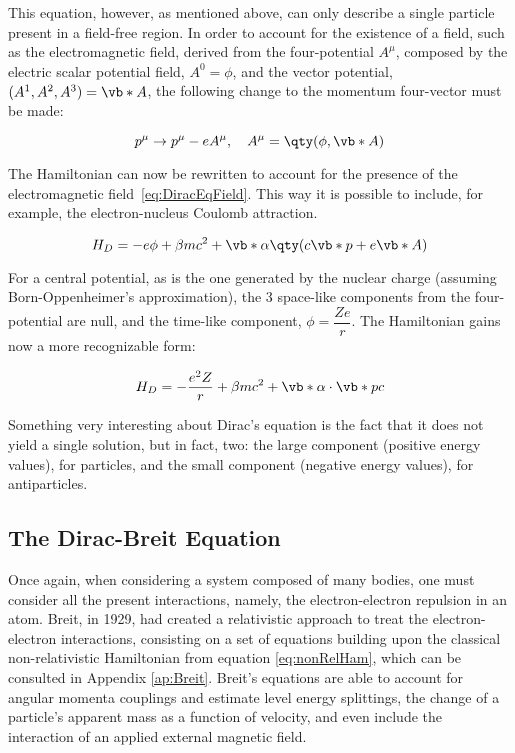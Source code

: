 This equation, however, as mentioned above, can only describe a single particle present in a field-free region. In order to account for the existence of a field, such as the electromagnetic field, derived from the four-potential $A^\mu$, composed by the electric scalar potential field, $A^0=\phi$, and the vector potential, $(A^1,A^2,A^3)=\vb*{A}$, the following change to the momentum four-vector must be made:


\begin{equation}
    p^\mu \rightarrow p^\mu - e A^\mu,\quad A^\mu = \qty(\phi,\vb*{A})
\end{equation}

The Hamiltonian can now be rewritten to account for the presence of the electromagnetic field~\eqref{eq:DiracEqField}. This way it is possible to include, for example, the electron-nucleus Coulomb attraction.

\begin{equation}
    H_D=-e\phi + \beta m c^2 + \vb*{\alpha}\qty(c\vb*{p}+e\vb*{A})
    \label{eq:DiracEqField}
\end{equation}

For a central potential, as is the one generated by the nuclear charge (assuming Born-Oppenheimer's approximation), the 3 space-like components from the four-potential are null, and the time-like component, $\phi=\dfrac{Z e}{r}$. The Hamiltonian gains now a more recognizable form:

\begin{equation}
    H_D=-\frac{e^2 Z}{r} + \beta m c^2 + \vb*{\alpha}\cdot\vb*{p}c
    \label{eq:diracHam}
\end{equation}

Something very interesting about Dirac's equation is the fact that it does not yield a single solution, but in fact, two: the large component (positive energy values), for particles, and the small component (negative energy values), for antiparticles.

\subsection{The Dirac-Breit Equation}

Once again, when considering a system composed of many bodies, one must consider all the present interactions, namely, the electron-electron repulsion in an atom.
 Breit, in 1929, had created a relativistic approach to treat the electron-electron interactions, consisting on a set of equations building upon the classical non-relativistic Hamiltonian from equation \eqref{eq:nonRelHam}, which can be consulted in Appendix \ref{ap:Breit}.
  Breit's equations are able to account for angular momenta couplings and estimate level energy splittings, the change of a particle's apparent mass as a function of velocity, and even include the interaction of an applied external magnetic field.\cite{Bethe1977}

